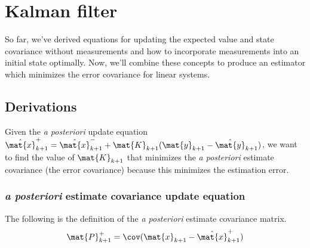 \section{Kalman filter}

So far, we've derived equations for updating the expected value and state
covariance without measurements and how to incorporate measurements into an
initial \gls{state} optimally. Now, we'll combine these concepts to produce an
estimator which minimizes the error covariance for linear \glspl{system}.

\subsection{Derivations}

Given the \textit{a posteriori} update equation
$\hat{\mat{x}}_{k+1}^+ = \hat{\mat{x}}_{k+1}^- + \mat{K}_{k+1}(\mat{y}_{k+1} -
\hat{\mat{y}}_{k+1})$, we want to find the value of $\mat{K}_{k+1}$ that
minimizes the \textit{a posteriori} estimate covariance (the error covariance)
because this minimizes the estimation error.

\subsubsection{\textit{a posteriori} estimate covariance update equation}

The following is the definition of the \textit{a posteriori} estimate covariance
matrix.
\begin{equation*}
  \mat{P}_{k+1}^+ = \cov(\mat{x}_{k+1} - \hat{\mat{x}}_{k+1}^+)
\end{equation*}

